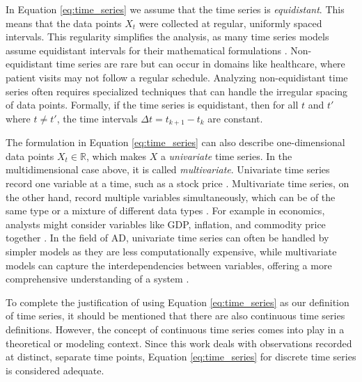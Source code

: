 In Equation \ref{eq:time_series} we assume that the time series is \textit{equidistant}. This means that the data points $X_t$ were collected at regular, uniformly spaced intervals. This regularity simplifies the analysis, as many time series models assume equidistant intervals for their mathematical formulations \cite{Chatfield2003}.
Non-equidistant time series are rare but can occur in domains like healthcare, where patient visits may not follow a regular schedule. Analyzing non-equidistant time series often requires specialized techniques that can handle the irregular spacing of data points.
Formally, if the time series is equidistant, then for all $t$ and $t'$ where $t \neq t'$, the time intervals $\Delta t = t_{k+1} - t_k$ are constant.

The formulation in Equation \ref{eq:time_series} can also describe one-dimensional data points $X_t \in \mathbb{R}$, which makes $X$ a \textit{univariate} time series. In the multidimensional case above, it is called \textit{multivariate}.
Univariate time series record one variable at a time, such as a stock price \cite{Sinha2022}. Multivariate time series, on the other hand, record multiple variables simultaneously, which can be of the same type or a mixture of different data types \cite{Chandola2009}. For example in economics, analysts might consider variables like GDP, inflation, and commodity price together \cite{Verstyuk2019}.
In the field of AD, univariate time series can often be handled by simpler models as they are less computationally expensive, while multivariate models can capture the interdependencies between variables, offering a more comprehensive understanding of a system \cite{Chandola2009}.

To complete the justification of using Equation \ref{eq:time_series} as our definition of time series, it should be mentioned that there are also continuous time series definitions. However, the concept of continuous time series comes into play in a theoretical or modeling context. Since this work deals with observations recorded at distinct, separate time points, Equation \ref{eq:time_series} for discrete time series is considered adequate.


